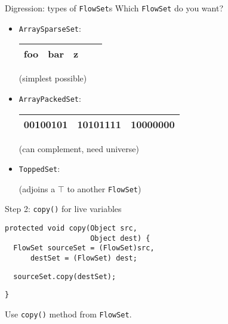 \begin{slide}{Digression: types of {\tt FlowSet}s}
\vspace*{-0.1in}
Which {\tt FlowSet} do you want?
\begin{itemize}
\item {\tt ArraySparseSet}:

\qquad \begin{tabular}{|c|c|c|c|c|} \hline
foo & bar & z & \\ \hline
\end{tabular}

(simplest possible)


\item {\tt ArrayPackedSet}:

\qquad \begin{tabular}{|c|c|c|} \hline
00100101 & 10101111 & 10000000 \\ \hline
\end{tabular}

(can complement, need universe)

\item {\tt ToppedSet}: 


(adjoins a $\top$ to another {\tt FlowSet})

\end{itemize}
\end{slide}

\begin{slide}{Step 2: {\tt copy()} for live variables}
\begin{verbatim}
protected void copy(Object src, 
                    Object dest) {
  FlowSet sourceSet = (FlowSet)src,
      destSet = (FlowSet) dest;

\end{verbatim}    
{\red\verb+  sourceSet.copy(destSet);+}
\begin{verbatim}
}
\end{verbatim}

\qquad

Use {\tt copy()} method from {\tt FlowSet}.
\end{slide}


